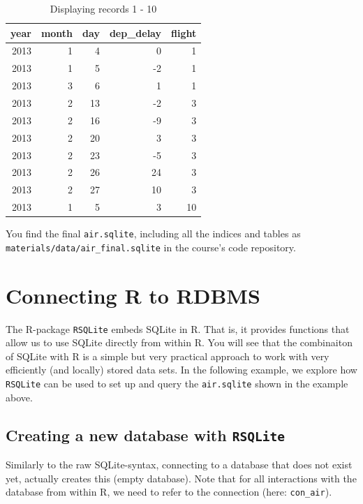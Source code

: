 \documentclass[
  12pt,
]{style/krantz}
\begin{document}
\begin{table}

\caption{\label{tab:unnamed-chunk-127}Displaying records 1 - 10}
\centering
\begin{tabular}[t]{r|r|r|r|r}
\hline
year & month & day & dep\_delay & flight\\
\hline
2013 & 1 & 4 & 0 & 1\\
\hline
2013 & 1 & 5 & -2 & 1\\
\hline
2013 & 3 & 6 & 1 & 1\\
\hline
2013 & 2 & 13 & -2 & 3\\
\hline
2013 & 2 & 16 & -9 & 3\\
\hline
2013 & 2 & 20 & 3 & 3\\
\hline
2013 & 2 & 23 & -5 & 3\\
\hline
2013 & 2 & 26 & 24 & 3\\
\hline
2013 & 2 & 27 & 10 & 3\\
\hline
2013 & 1 & 5 & 3 & 10\\
\hline
\end{tabular}
\end{table}

You find the final \texttt{air.sqlite}, including all the indices and tables as \texttt{materials/data/air\_final.sqlite} in the course's code repository.

\hypertarget{connecting-r-to-rdbms}{%
\section{Connecting R to RDBMS}\label{connecting-r-to-rdbms}}

The R-package \texttt{RSQLite} embeds SQLite in R. That is, it provides functions that allow us to use SQLite directly from within R. You will see that the combinaiton of SQLite with R is a simple but very practical approach to work with very efficiently (and locally) stored data sets. In the following example, we explore how \texttt{RSQLite} can be used to set up and query the \texttt{air.sqlite} shown in the example above.

\hypertarget{creating-a-new-database-with-rsqlite}{%
\subsection{\texorpdfstring{Creating a new database with \texttt{RSQLite}}{Creating a new database with RSQLite}}\label{creating-a-new-database-with-rsqlite}}

Similarly to the raw SQLite-syntax, connecting to a database that does not exist yet, actually creates this (empty database). Note that for all interactions with the database from within R, we need to refer to the connection (here: \texttt{con\_air}).
\end{document}
